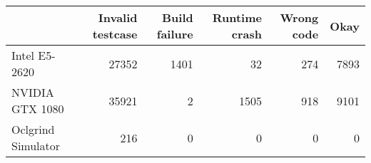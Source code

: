 \begin{tabular}{lrrrrr}
\toprule
{} &  Invalid testcase &  Build failure &  Runtime crash &  Wrong code &  Okay \\
\midrule
Intel E5-2620      &             27352 &           1401 &             32 &         274 &  7893 \\
NVIDIA GTX 1080    &             35921 &              2 &           1505 &         918 &  9101 \\
Oclgrind Simulator &               216 &              0 &              0 &           0 &     0 \\
\bottomrule
\end{tabular}
